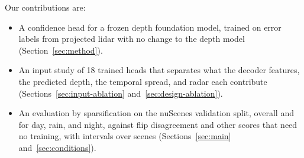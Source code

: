 
Our contributions are:
\begin{itemize}[leftmargin=*, itemsep=1pt, topsep=2pt]
  \item A confidence head for a frozen depth foundation model, trained on error labels from projected lidar with no change to the depth model (Section~\ref{sec:method}). 
  \item An input study of 18 trained heads that separates what the decoder features, the predicted depth, the temporal spread, and radar each contribute (Sections~\ref{sec:input-ablation} and~\ref{sec:design-ablation}). 
  \item An evaluation by sparsification on the nuScenes validation split, overall and for day, rain, and night, against flip disagreement and other scores that need no training, with intervals over scenes (Sections~\ref{sec:main} and~\ref{sec:conditions}). 
\end{itemize}
